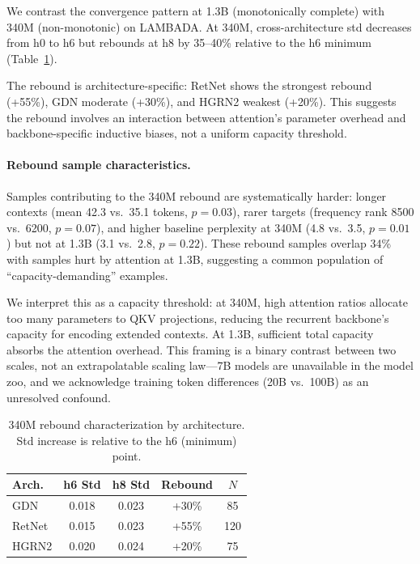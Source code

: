 \documentclass[11pt,twocolumn]{article}
\begin{document}
We contrast the convergence pattern at 1.3B (monotonically complete) with 340M (non-monotonic) on LAMBADA.
At 340M, cross-architecture std decreases from h0 to h6 but rebounds at h8 by 35--40\% relative to the h6 minimum (Table~\ref{tab:rebound}).

The rebound is architecture-specific: RetNet shows the strongest rebound (+55\%), GDN moderate (+30\%), and HGRN2 weakest (+20\%).
This suggests the rebound involves an interaction between attention's parameter overhead and backbone-specific inductive biases, not a uniform capacity threshold.

\paragraph{Rebound sample characteristics.}
Samples contributing to the 340M rebound are systematically harder: longer contexts (mean 42.3 vs.\ 35.1 tokens, $p{=}0.03$), rarer targets (frequency rank 8500 vs.\ 6200, $p{=}0.07$), and higher baseline perplexity at 340M (4.8 vs.\ 3.5, $p{=}0.01$) but not at 1.3B (3.1 vs.\ 2.8, $p{=}0.22$).
These rebound samples overlap 34\% with samples hurt by attention at 1.3B, suggesting a common population of ``capacity-demanding'' examples.

We interpret this as a capacity threshold: at 340M, high attention ratios allocate too many parameters to QKV projections, reducing the recurrent backbone's capacity for encoding extended contexts.
At 1.3B, sufficient total capacity absorbs the attention overhead.
This framing is a binary contrast between two scales, not an extrapolatable scaling law---7B models are unavailable in the model zoo, and we acknowledge training token differences (20B vs.\ 100B) as an unresolved confound.

\begin{table}[t]
\centering
\small
\caption{340M rebound characterization by architecture. Std increase is relative to the h6 (minimum) point.}\label{tab:rebound}
\begin{tabular}{@{}lcccc@{}}
\toprule
\textbf{Arch.} & \textbf{h6 Std} & \textbf{h8 Std} & \textbf{Rebound} & \textbf{$N$} \\
\midrule
GDN & 0.018 & 0.023 & +30\% & 85 \\
RetNet & 0.015 & 0.023 & +55\% & 120 \\
HGRN2 & 0.020 & 0.024 & +20\% & 75 \\
\bottomrule
\end{tabular}
\end{table}
\end{document}
